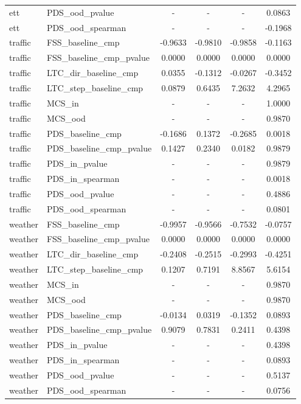 \begin{table}[t]
\begin{tabular}{l l c c c c}
ett & PDS_ood_pvalue & - & - & - & 0.0863 \\
ett & PDS_ood_spearman & - & - & - & -0.1968 \\
traffic & FSS_baseline_cmp & -0.9633 & -0.9810 & -0.9858 & -0.1163 \\
traffic & FSS_baseline_cmp_pvalue & 0.0000 & 0.0000 & 0.0000 & 0.0000 \\
traffic & LTC_dir_baseline_cmp & 0.0355 & -0.1312 & -0.0267 & -0.3452 \\
traffic & LTC_step_baseline_cmp & 0.0879 & 0.6435 & 7.2632 & 4.2965 \\
traffic & MCS_in & - & - & - & 1.0000 \\
traffic & MCS_ood & - & - & - & 0.9870 \\
traffic & PDS_baseline_cmp & -0.1686 & 0.1372 & -0.2685 & 0.0018 \\
traffic & PDS_baseline_cmp_pvalue & 0.1427 & 0.2340 & 0.0182 & 0.9879 \\
traffic & PDS_in_pvalue & - & - & - & 0.9879 \\
traffic & PDS_in_spearman & - & - & - & 0.0018 \\
traffic & PDS_ood_pvalue & - & - & - & 0.4886 \\
traffic & PDS_ood_spearman & - & - & - & 0.0801 \\
weather & FSS_baseline_cmp & -0.9957 & -0.9566 & -0.7532 & -0.0757 \\
weather & FSS_baseline_cmp_pvalue & 0.0000 & 0.0000 & 0.0000 & 0.0000 \\
weather & LTC_dir_baseline_cmp & -0.2408 & -0.2515 & -0.2993 & -0.4251 \\
weather & LTC_step_baseline_cmp & 0.1207 & 0.7191 & 8.8567 & 5.6154 \\
weather & MCS_in & - & - & - & 0.9870 \\
weather & MCS_ood & - & - & - & 0.9870 \\
weather & PDS_baseline_cmp & -0.0134 & 0.0319 & -0.1352 & 0.0893 \\
weather & PDS_baseline_cmp_pvalue & 0.9079 & 0.7831 & 0.2411 & 0.4398 \\
weather & PDS_in_pvalue & - & - & - & 0.4398 \\
weather & PDS_in_spearman & - & - & - & 0.0893 \\
weather & PDS_ood_pvalue & - & - & - & 0.5137 \\
weather & PDS_ood_spearman & - & - & - & 0.0756 \\
\bottomrule
\end{tabular}
\end{table}
